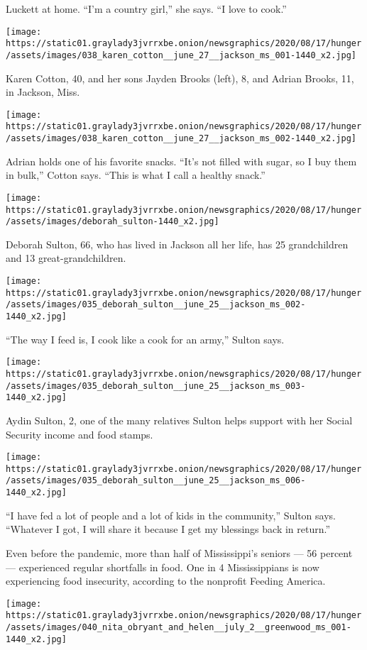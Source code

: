 Luckett at home. ``I'm a country girl,'' she says. ``I love to cook.''

\texttt{[image: https://static01.graylady3jvrrxbe.onion/newsgraphics/2020/08/17/hunger/assets/images/038\_karen\_cotton\_\_june\_27\_\_jackson\_ms\_001-1440\_x2.jpg]}

Karen Cotton, 40, and her sons Jayden Brooks (left), 8, and Adrian
Brooks, 11, in Jackson, Miss.

\texttt{[image: https://static01.graylady3jvrrxbe.onion/newsgraphics/2020/08/17/hunger/assets/images/038\_karen\_cotton\_\_june\_27\_\_jackson\_ms\_002-1440\_x2.jpg]}

Adrian holds one of his favorite snacks. ``It's not filled with sugar,
so I buy them in bulk,'' Cotton says. ``This is what I call a healthy
snack.''

\texttt{[image: https://static01.graylady3jvrrxbe.onion/newsgraphics/2020/08/17/hunger/assets/images/deborah\_sulton-1440\_x2.jpg]}

Deborah Sulton, 66, who has lived in Jackson all her life, has 25
grandchildren and 13 great-grandchildren.

\texttt{[image: https://static01.graylady3jvrrxbe.onion/newsgraphics/2020/08/17/hunger/assets/images/035\_deborah\_sulton\_\_june\_25\_\_jackson\_ms\_002-1440\_x2.jpg]}

``The way I feed is, I cook like a cook for an army,'' Sulton says.

\texttt{[image: https://static01.graylady3jvrrxbe.onion/newsgraphics/2020/08/17/hunger/assets/images/035\_deborah\_sulton\_\_june\_25\_\_jackson\_ms\_003-1440\_x2.jpg]}

Aydin Sulton, 2, one of the many relatives Sulton helps support with her
Social Security income and food stamps.

\texttt{[image: https://static01.graylady3jvrrxbe.onion/newsgraphics/2020/08/17/hunger/assets/images/035\_deborah\_sulton\_\_june\_25\_\_jackson\_ms\_006-1440\_x2.jpg]}

``I have fed a lot of people and a lot of kids in the community,''
Sulton says. ``Whatever I got, I will share it because I get my
blessings back in return.''

Even before the pandemic, more than half of Mississippi's seniors --- 56
percent --- experienced regular shortfalls in food. One in 4
Mississippians is now experiencing food insecurity, according to the
nonprofit Feeding America.

\texttt{[image: https://static01.graylady3jvrrxbe.onion/newsgraphics/2020/08/17/hunger/assets/images/040\_nita\_obryant\_and\_helen\_\_july\_2\_\_greenwood\_ms\_001-1440\_x2.jpg]}

